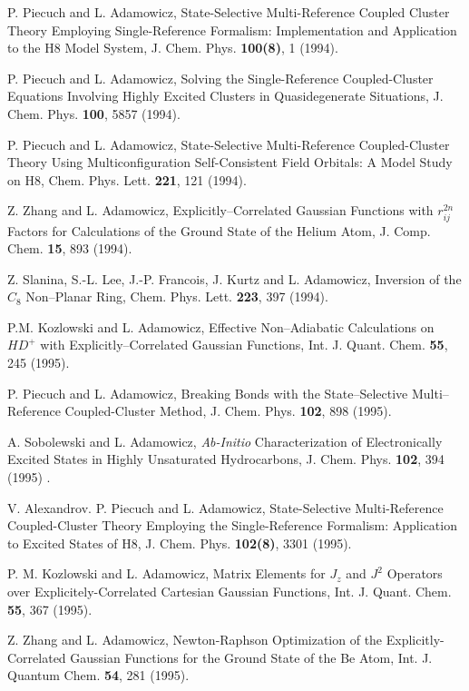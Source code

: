 \begin{thebibliography}{999}
P. Piecuch and L. Adamowicz, State-Selective Multi-Reference 
Coupled Cluster Theory Employing
Single-Reference Formalism:  Implementation and Application 
to the H8 Model System, J. Chem. Phys.
{\bf 100(8)}, 1 (1994).

P. Piecuch and L. Adamowicz, Solving the Single-Reference 
Coupled-Cluster Equations Involving
Highly Excited Clusters in Quasidegenerate Situations, 
J. Chem. Phys. {\bf 100}, 5857 (1994).

P. Piecuch and L. Adamowicz, State-Selective 
Multi-Reference Coupled-Cluster Theory Using
Multiconfiguration Self-Consistent Field Orbitals:  A 
Model Study on H8, Chem. Phys. Lett. {\bf 221}, 121
(1994).

  Z. Zhang and L. Adamowicz, Explicitly--Correlated 
Gaussian Functions with $r_{ij}^{2n}$ Factors for Calculations
of the Ground State of the Helium Atom, J. Comp. Chem. 
{\bf 15}, 893 (1994).

Z. Slanina, S.-L. Lee, J.-P. Francois, J. Kurtz 
and L. Adamowicz, Inversion of the $C_8$ Non--Planar Ring,
Chem. Phys. Lett. {\bf 223}, 397 (1994).

  P.M. Kozlowski and L. Adamowicz, Effective 
Non--Adiabatic Calculations on $HD^{+}$ with 
Explicitly--Correlated Gaussian Functions, 
Int. J. Quant. Chem. {\bf 55}, 245 (1995).

P. Piecuch and L. Adamowicz, Breaking 
Bonds with the State--Selective Multi--Reference Coupled-Cluster 
Method, J. Chem. Phys. {\bf 102}, 898 (1995).

A. Sobolewski  and L. Adamowicz, {\it Ab-Initio} 
Characterization of Electronically Excited States in
Highly Unsaturated Hydrocarbons, J. Chem. Phys. 
{\bf 102}, 394 (1995) .

V. Alexandrov. P. Piecuch and L. Adamowicz, 
State-Selective Multi-Reference Coupled-Cluster Theory
Employing the Single-Reference Formalism:  Application 
to Excited States of H8, J. Chem. Phys.
{\bf 102(8)}, 3301 (1995).

P. M. Kozlowski and L. Adamowicz, Matrix Elements 
for  $J_z$ and $J^2$  Operators over Explicitely-Correlated
Cartesian Gaussian Functions, 
Int. J. Quant. Chem. {\bf 55}, 367 (1995).

Z. Zhang and L. Adamowicz, Newton-Raphson Optimization 
of the Explicitly-Correlated Gaussian
Functions for the Ground State of the Be Atom, 
Int. J. Quantum Chem.  {\bf 54}, 281 (1995).


\end{thebibliography}
